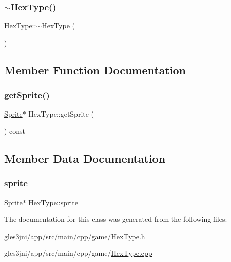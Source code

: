 \mbox{\label{class_hex_type_ac0b7d6bad02fd7bf5bcf355e2f3b5cd1}} 
\subsubsection{\texorpdfstring{$\sim$\+Hex\+Type()}{~HexType()}}
{\footnotesize\ttfamily Hex\+Type\+::$\sim$\+Hex\+Type (\begin{DoxyParamCaption}{ }\end{DoxyParamCaption})}



\subsection{Member Function Documentation}
\mbox{\label{class_hex_type_af3d3b65517191fda8edcab4c2477f5eb}} 
\subsubsection{\texorpdfstring{get\+Sprite()}{getSprite()}}
{\footnotesize\ttfamily \hyperlink{class_sprite}{Sprite}$\ast$ Hex\+Type\+::get\+Sprite (\begin{DoxyParamCaption}{ }\end{DoxyParamCaption}) const\hspace{0.3cm}{\ttfamily [inline]}}



\subsection{Member Data Documentation}
\mbox{\label{class_hex_type_a7f1c5fa0871568503aba259e76ce8758}} 
\subsubsection{\texorpdfstring{sprite}{sprite}}
{\footnotesize\ttfamily \hyperlink{class_sprite}{Sprite}$\ast$ Hex\+Type\+::sprite\hspace{0.3cm}{\ttfamily [private]}}



The documentation for this class was generated from the following files\+:\begin{DoxyCompactItemize}
\item 
gles3jni/app/src/main/cpp/game/\hyperlink{_hex_type_8h}{Hex\+Type.\+h}\item 
gles3jni/app/src/main/cpp/game/\hyperlink{_hex_type_8cpp}{Hex\+Type.\+cpp}\end{DoxyCompactItemize}
